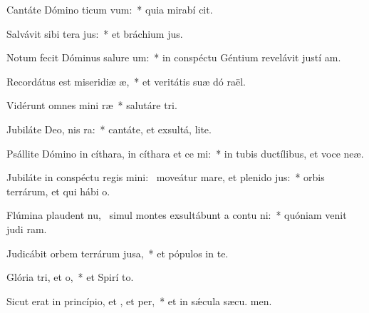 \item Cantáte Dómino ticum vum:~* quia mirabí cit.
\item Salvávit sibi tera jus:~* et bráchium  jus.
\item Notum fecit Dóminus salure um:~* in conspéctu Géntium revelávit justí am.
\item Recordátus est miseridiæ æ,~* et veritátis suæ dó raël.
\item Vidérunt omnes mini ræ~* salutáre  tri.
\item Jubiláte Deo, nis ra:~* cantáte, et exsultá,  lite.
\item Psállite Dómino in cíthara, in cíthara et ce mi:~* in tubis ductílibus, et voce  neæ.
\item Jubiláte in conspéctu regis mini:~\pscross{} moveátur mare, et plenido jus:~* orbis terrárum, et qui hábi  o.
\item Flúmina plaudent nu,~\pscross{} simul montes exsultábunt a contu ni:~* quóniam venit judi ram.
\item Judicábit orbem terrárum  jusa,~* et pópulos in te.
\item Glória tri, et o,~* et Spirí to.
\item Sicut erat in princípio, et , et per,~* et in sǽcula sæcu. men.
